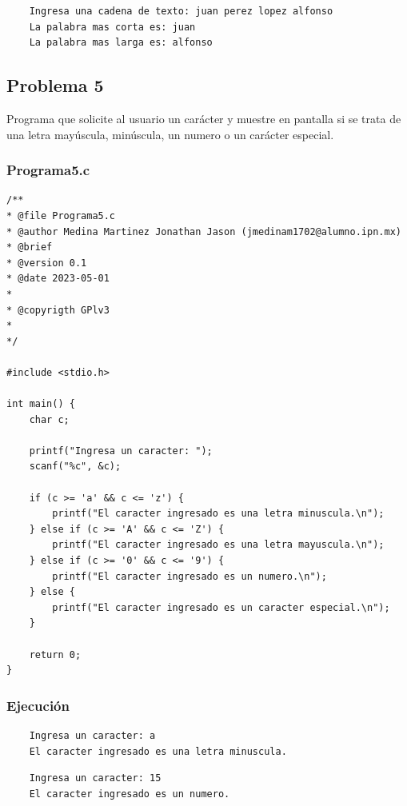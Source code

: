 \documentclass{article}
\begin{document}
	\begin{lstlisting}
	Ingresa una cadena de texto: juan perez lopez alfonso 
	La palabra mas corta es: juan
	La palabra mas larga es: alfonso
	\end{lstlisting}
	
	\newpage
	
	\subsection{Problema 5}
	
	Programa que solicite al usuario un carácter y muestre en pantalla si se trata de una letra mayúscula, minúscula, un numero o un carácter especial.
	
	\subsubsection{Programa5.c}
	
	\begin{lstlisting}
/**
* @file Programa5.c
* @author Medina Martinez Jonathan Jason (jmedinam1702@alumno.ipn.mx)
* @brief 
* @version 0.1
* @date 2023-05-01
* 
* @copyrigth GPlv3
* 
*/

#include <stdio.h>

int main() {
	char c;
	
	printf("Ingresa un caracter: ");
	scanf("%c", &c);
	
	if (c >= 'a' && c <= 'z') {
		printf("El caracter ingresado es una letra minuscula.\n");
	} else if (c >= 'A' && c <= 'Z') {
		printf("El caracter ingresado es una letra mayuscula.\n");
	} else if (c >= '0' && c <= '9') {
		printf("El caracter ingresado es un numero.\n");
	} else {
		printf("El caracter ingresado es un caracter especial.\n");
	}
	
	return 0;
}
	\end{lstlisting}
	
	\subsubsection{Ejecución}
	
	\begin{lstlisting}
	Ingresa un caracter: a
	El caracter ingresado es una letra minuscula.
	\end{lstlisting}
	
	\begin{lstlisting}
	Ingresa un caracter: 15
	El caracter ingresado es un numero.
	\end{lstlisting}
	
\end{document}
